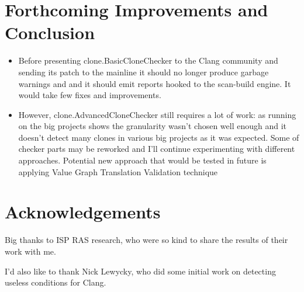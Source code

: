 \documentclass[a0,portrait]{a0poster}
\begin{document}
\begin{multicols}{2}

\section*{Forthcoming Improvements and Conclusion}

\begin{itemize}
\item Before presenting clone.BasicCloneChecker to the Clang community and sending its patch to 
the mainline it should no longer produce garbage warnings and and it should emit reports hooked to 
the scan-build engine. It would take few fixes and improvements.
\item However, clone.AdvancedCloneChecker still requires a lot of work: as running on the big 
projects shows the granularity wasn't chosen well enough and it doesn't detect many clones in
various big projects as it was expected. Some of checker parts may be reworked and I'll continue
experimenting with different approaches. Potential new approach that would be tested in future
is applying Value Graph Translation Validation technique \cite{ValueGraphLLVM}
\end{itemize}


\nocite{*} %


\section*{Acknowledgements}

Big thanks to ISP RAS research, who were so kind to share the results of their work with me.

I'd also like to thank Nick Lewycky, who did some initial work on detecting useless conditions
for Clang.


\end{multicols}
\end{document}
